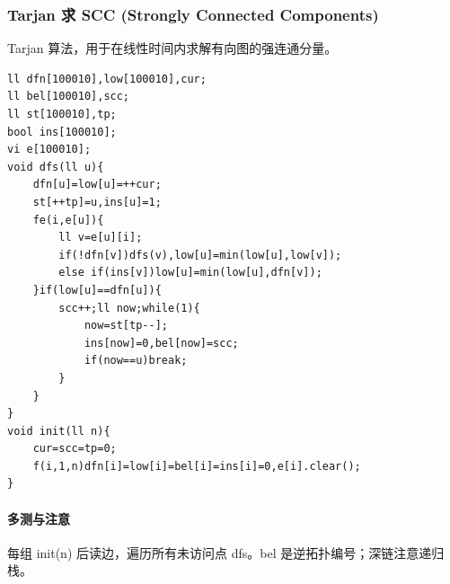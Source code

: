 \subsubsection{Tarjan 求 SCC (Strongly Connected Components)}
Tarjan 算法，用于在线性时间内求解有向图的强连通分量。
\begin{lstlisting}
ll dfn[100010],low[100010],cur;
ll bel[100010],scc;
ll st[100010],tp;
bool ins[100010];
vi e[100010];
void dfs(ll u){
	dfn[u]=low[u]=++cur;
	st[++tp]=u,ins[u]=1;
	fe(i,e[u]){
		ll v=e[u][i];
		if(!dfn[v])dfs(v),low[u]=min(low[u],low[v]);
		else if(ins[v])low[u]=min(low[u],dfn[v]);
	}if(low[u]==dfn[u]){
		scc++;ll now;while(1){
			now=st[tp--];
			ins[now]=0,bel[now]=scc;
			if(now==u)break;
		}
	}
}
void init(ll n){
    cur=scc=tp=0;
    f(i,1,n)dfn[i]=low[i]=bel[i]=ins[i]=0,e[i].clear();
}
\end{lstlisting}

\paragraph{多测与注意} 每组 init(n) 后读边，遍历所有未访问点 dfs。bel 是逆拓扑编号；深链注意递归栈。
